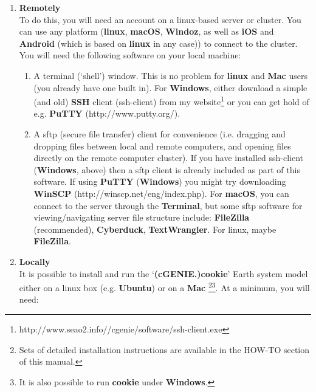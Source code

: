 \begin{enumerate}[noitemsep]

\vspace{1mm}
\item \textbf{Remotely}
\\To do this, you will need an account on a linux-based server or cluster. You can use any platform (\textbf{linux}, \textbf{macOS}, \textbf{Windoz}, as well as \textbf{iOS} and \textbf{Android} (which is based on \textbf{linux} in any case)) to connect to the cluster. You will need the following software on your local machine:
\vspace{1mm}
\begin{enumerate}[noitemsep]
\setlength{\itemindent}{.2in}
\item A terminal (‘shell’) window. This is no problem for \textbf{linux} and \textbf{Mac} users (you already have one built in). For \textbf{Windows}, either download a simple (and old) \textbf{SSH} client (ssh-client) from my website\footnote{http://www.seao2.info//cgenie/software/ssh-client.exe} or you can get hold of e.g. \textbf{PuTTY} (http://www.putty.org/).
\item A sftp (secure file transfer) client for convenience (i.e. dragging and dropping files between local and remote computers, and opening files directly on the remote computer cluster). If you have installed ssh-client (\textbf{Windows}, above) then a sftp client is already included as part of this software. If using \textbf{PuTTY} (\textbf{Windows}) you might try downloading \textbf{WinSCP} (http://winscp.net/eng/index.php). For \textbf{macOS}, you can connect to the server through the \textbf{Terminal}, but some sftp software for viewing/navigating server file structure include: \textbf{FileZilla} (recommended), \textbf{Cyberduck}, \textbf{TextWrangler}. For linux, maybe \textbf{FileZilla}.
\end{enumerate}

\vspace{1mm}
\item \textbf{Locally}
\\It is  possible to install and run the ‘\textbf{(cGENIE.)cookie}’ Earth system model either on a linux box (e.g. \textbf{Ubuntu}) or on a \textbf{Mac} \footnote{Sets of detailed installation instructions are available in the HOW-TO section of this manual.}\footnote{It is also possible to run \textbf{cookie} under \textbf{Windows}.}. At a minimum, you will need:

\newpage


\end{enumerate}
